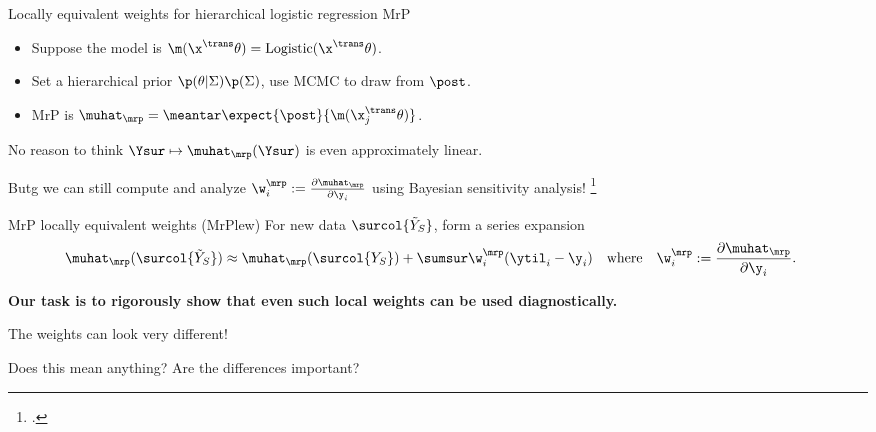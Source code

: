 \begin{frame}[t]{Locally equivalent weights for hierarchical logistic regression MrP}

\def\Y{\surcol{Y_S}}
\def\Ytil{\surcol{\tilde{Y}_S}}
%
\begin{itemize}
    \item Suppose the model is $\m(\x^\trans \theta) = \mathrm{Logistic}(\x^\trans \theta)$.
    \item Set a hierarchical prior $\p(\theta \vert \Sigma)\p(\Sigma)$,
            use MCMC to draw from $\post$.
    \item MrP is $\muhat_\mrp = \meantar \expect{\post}{\m(\x_j^\trans \theta)}$.
\end{itemize}
%
No reason to think $\Ysur \mapsto \muhat_\mrp(\Ysur)$ is even approximately linear.

Butg we can still compute and analyze $\w_i^\mrp := \frac{\partial \muhat_\mrp}{\partial \y_i}$
using Bayesian sensitivity analysis!
\footcite{gustafson:1996:localposterior,giordano:2018:covariances}

\pause
\begin{block}{MrP locally equivalent weights (MrPlew)}
\centering
\vspace{1em}
For new data $\Ytil$, form a series expansion
$$
\begin{aligned}
\muhat_\mrp(\Ytil) \approx{}& \muhat_\mrp(\Y) + \sumsur \w_i^\mrp (\ytil_i - \y_i)\quad
\textrm{where}\quad \w_i^\mrp :={} \frac{\partial \muhat_\mrp}{\partial \y_i}.
\end{aligned}
$$
\vspace{1em}
\end{block}
%
\pause
\textbf{
Our task is to rigorously show that even such local weights can be used
diagnostically.
}

%


\end{frame}




\begin{frame}{The weights can look very different!}

    \centering
    Does this mean anything?  Are the differences important?

    \AlexanderWeightPlot{}
\end{frame}


